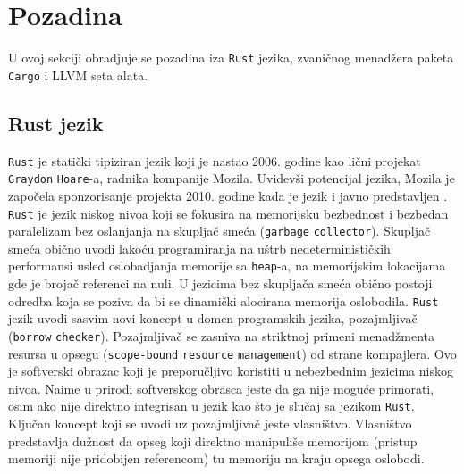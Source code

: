 \section{Pozadina}

U ovoj sekciji obradjuje se pozadina iza \verb|Rust| jezika, zvaničnog menadžera paketa \verb|Cargo| i 
LLVM seta alata.

\subsection{Rust jezik}

\verb|Rust| je statički tipiziran jezik koji je nastao 2006. godine kao lični projekat \verb|Graydon| \verb|Hoare|-a, radnika kompanije 
Mozila. Uvidevši potencijal jezika, Mozila je započela sponzorisanje projekta 2010. godine kada je jezik i javno 
predstavljen \cite{rust-language}. \verb|Rust| je jezik niskog nivoa koji se fokusira na memorijsku bezbednost
i bezbedan paralelizam bez oslanjanja na skupljač smeća (\verb|garbage| \verb|collector|). Skupljač smeća 
obično uvodi lakoću programiranja na uštrb nedeterminističkih performansi usled oslobadjanja memorije 
sa \verb|heap|-a, na memorijskim lokacijama gde je brojač referenci na nuli. U jezicima bez skupljača 
smeća obično postoji odredba koja se poziva da bi se dinamički alocirana memorija oslobodila. \verb|Rust|
jezik uvodi sasvim novi koncept u domen programskih jezika, pozajmljivač (\verb|borrow| \verb|checker|).
Pozajmljivač se zasniva na striktnoj primeni menadžmenta resursa u opsegu (\verb|scope-bound| \verb|resource| \verb|management|) 
od strane kompajlera. Ovo je softverski obrazac koji je preporučljivo koristiti u nebezbednim jezicima 
niskog nivoa. Naime u prirodi softverskog obrasca jeste da ga nije moguće primorati, osim ako nije direktno
integrisan u jezik kao što je slučaj sa jezikom \verb|Rust|. Ključan koncept koji se uvodi uz pozajmljivač 
jeste vlasništvo. Vlasništvo predstavlja dužnost da opseg koji direktno manipuliše memorijom (pristup memoriji nije 
pridobijen referencom) tu memoriju na kraju opsega oslobodi. 

